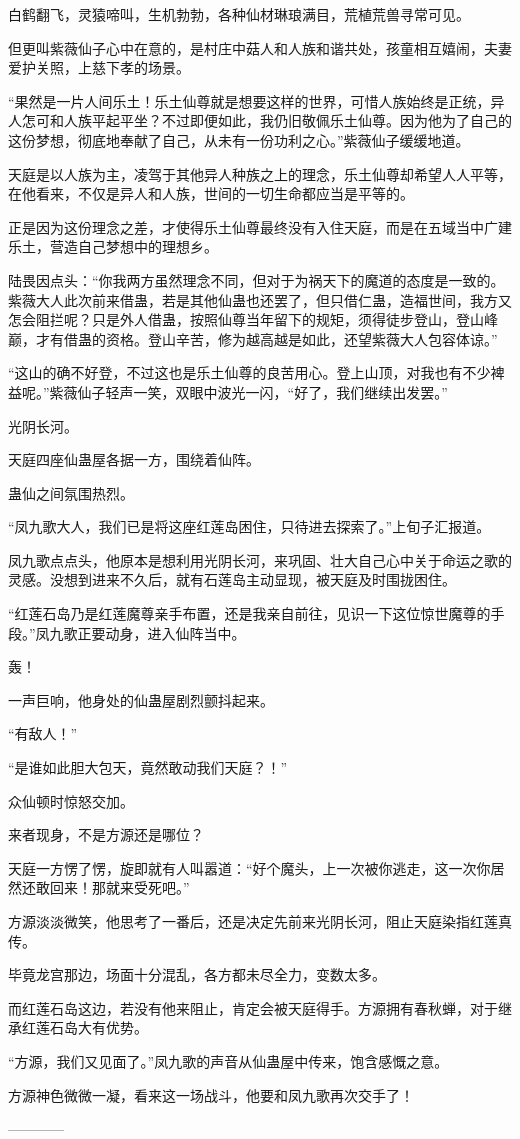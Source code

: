 \begin{this_body}
白鹤翻飞，灵猿啼叫，生机勃勃，各种仙材琳琅满目，荒植荒兽寻常可见。

但更叫紫薇仙子心中在意的，是村庄中菇人和人族和谐共处，孩童相互嬉闹，夫妻爱护关照，上慈下孝的场景。

“果然是一片人间乐土！乐土仙尊就是想要这样的世界，可惜人族始终是正统，异人怎可和人族平起平坐？不过即便如此，我仍旧敬佩乐土仙尊。因为他为了自己的这份梦想，彻底地奉献了自己，从未有一份功利之心。”紫薇仙子缓缓地道。

天庭是以人族为主，凌驾于其他异人种族之上的理念，乐土仙尊却希望人人平等，在他看来，不仅是异人和人族，世间的一切生命都应当是平等的。

正是因为这份理念之差，才使得乐土仙尊最终没有入住天庭，而是在五域当中广建乐土，营造自己梦想中的理想乡。

陆畏因点头：“你我两方虽然理念不同，但对于为祸天下的魔道的态度是一致的。紫薇大人此次前来借蛊，若是其他仙蛊也还罢了，但只借仁蛊，造福世间，我方又怎会阻拦呢？只是外人借蛊，按照仙尊当年留下的规矩，须得徒步登山，登山峰巅，才有借蛊的资格。登山辛苦，修为越高越是如此，还望紫薇大人包容体谅。”

“这山的确不好登，不过这也是乐土仙尊的良苦用心。登上山顶，对我也有不少裨益呢。”紫薇仙子轻声一笑，双眼中波光一闪，“好了，我们继续出发罢。”

光阴长河。

天庭四座仙蛊屋各据一方，围绕着仙阵。

蛊仙之间氛围热烈。

“凤九歌大人，我们已是将这座红莲岛困住，只待进去探索了。”上旬子汇报道。

凤九歌点点头，他原本是想利用光阴长河，来巩固、壮大自己心中关于命运之歌的灵感。没想到进来不久后，就有石莲岛主动显现，被天庭及时围拢困住。

“红莲石岛乃是红莲魔尊亲手布置，还是我亲自前往，见识一下这位惊世魔尊的手段。”凤九歌正要动身，进入仙阵当中。

轰！

一声巨响，他身处的仙蛊屋剧烈颤抖起来。

“有敌人！”

“是谁如此胆大包天，竟然敢动我们天庭？！”

众仙顿时惊怒交加。

来者现身，不是方源还是哪位？

天庭一方愣了愣，旋即就有人叫嚣道：“好个魔头，上一次被你逃走，这一次你居然还敢回来！那就来受死吧。”

方源淡淡微笑，他思考了一番后，还是决定先前来光阴长河，阻止天庭染指红莲真传。

毕竟龙宫那边，场面十分混乱，各方都未尽全力，变数太多。

而红莲石岛这边，若没有他来阻止，肯定会被天庭得手。方源拥有春秋蝉，对于继承红莲石岛大有优势。

“方源，我们又见面了。”凤九歌的声音从仙蛊屋中传来，饱含感慨之意。

方源神色微微一凝，看来这一场战斗，他要和凤九歌再次交手了！

------------

\end{this_body}

